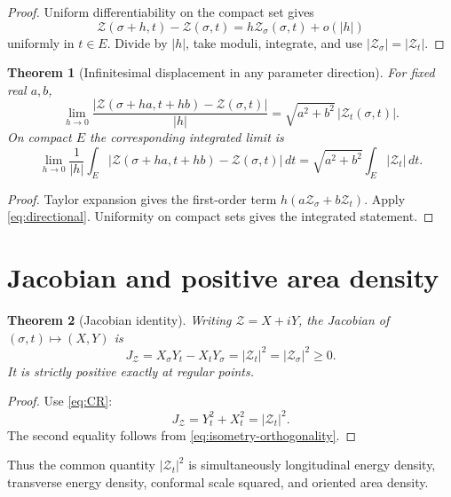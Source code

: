 \documentclass[11pt]{amsart}
\numberwithin{equation}{section}
\newtheorem{theorem}{Theorem}[section]
\newcommand{\Zcal}{\mathcal Z}
\newcommand{\dd}{\,d}
\begin{document}
\begin{proof}
Uniform differentiability on the compact set gives
\[
\Zcal(\sigma+h,t)-\Zcal(\sigma,t)
=h\Zcal_\sigma(\sigma,t)+o(|h|)
\]
uniformly in $t\in E$.  Divide by $|h|$, take moduli, integrate, and use $|\Zcal_\sigma|=|\Zcal_t|$.
\end{proof}

\begin{theorem}[Infinitesimal displacement in any parameter direction]
For fixed real $a,b$,
\begin{equation}
\boxed{
\lim_{h\to0}
\frac{|\Zcal(\sigma+ha,t+hb)-\Zcal(\sigma,t)|}{|h|}
=\sqrt{a^2+b^2}\,|\Zcal_t(\sigma,t)|.
}
\label{eq:any-direction}
\end{equation}
On compact $E$ the corresponding integrated limit is
\begin{equation}
\boxed{
\lim_{h\to0}\frac1{|h|}
\int_E|\Zcal(\sigma+ha,t+hb)-\Zcal(\sigma,t)|\dd t
=
\sqrt{a^2+b^2}\int_E|\Zcal_t|\dd t.
}
\label{eq:any-direction-integrated}
\end{equation}
\end{theorem}

\begin{proof}
Taylor expansion gives the first-order term $h(a\Zcal_\sigma+b\Zcal_t)$.  Apply \eqref{eq:directional}.  Uniformity on compact sets gives the integrated statement.
\end{proof}

\section{Jacobian and positive area density}

\begin{theorem}[Jacobian identity]
Writing $\Zcal=X+iY$, the Jacobian of $(\sigma,t)\mapsto(X,Y)$ is
\begin{equation}
\boxed{
J_{\Zcal}=X_\sigma Y_t-X_tY_\sigma
=|\Zcal_t|^2=|\Zcal_\sigma|^2\ge0.
}
\label{eq:jacobian}
\end{equation}
It is strictly positive exactly at regular points.
\end{theorem}

\begin{proof}
Use \eqref{eq:CR}:
\[
J_{\Zcal}=Y_t^2+X_t^2=|\Zcal_t|^2.
\]
The second equality follows from \eqref{eq:isometry-orthogonality}.
\end{proof}

Thus the common quantity $|\Zcal_t|^2$ is simultaneously longitudinal energy density, transverse energy density, conformal scale squared, and oriented area density.
\end{document}
